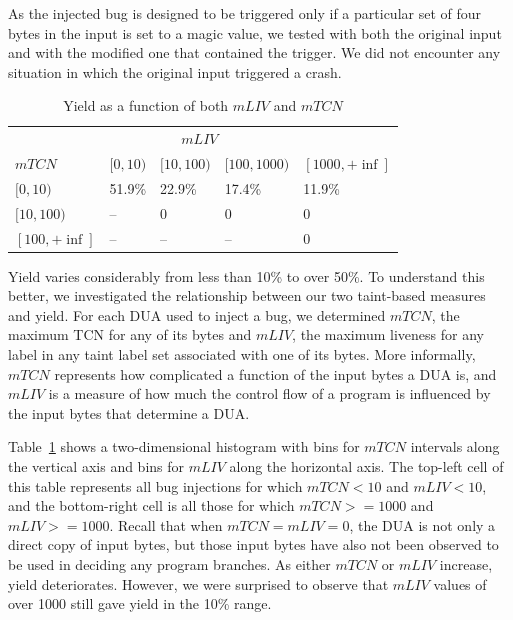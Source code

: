 As the injected bug is designed to be triggered only if a particular set of four bytes in the input is set to a magic value, we tested with both the original input and with the modified one that contained the trigger. 
We did not encounter any situation in which the original input triggered a crash.

\begin{table}[b]
\caption{Yield as a function of both $mLIV$ and $mTCN$}
\centering\footnotesize
\begin{tabular}{l|l|l|l|l} 
       & \multicolumn{3}{c}{$mLIV$} &  \\  
$mTCN$ &         $[0,10)$ & $[10,100)$ & $[100,1000)$ & $[1000,+\inf]$ \\  \hline 
$[0,10)$ &       51.9\%   & 22.9\%     & 17.4\%       & 11.9\%          \\
$[10,100)$ &     --       & 0          & 0            & 0     \\
$[100,+\inf]$ &  --       & --         & --           & 0     \\ 
\end{tabular}
\label{table:yield-breakdown}
\end{table}

Yield varies considerably from less than 10\% to over 50\%.
To understand this better, we investigated the relationship between our two taint-based measures and yield.
For each DUA used to inject a bug, we determined $mTCN$, the maximum TCN for any of its bytes and $mLIV$, the maximum liveness for any label in any taint label set associated with one of its bytes.  
More informally, $mTCN$ represents how complicated a function of the input bytes a DUA is, and $mLIV$ is a measure of how much the control flow of a program is influenced by the input bytes that determine a DUA.

Table~\ref{table:yield-breakdown} shows a two-dimensional histogram with bins for $mTCN$ intervals along the vertical axis and bins for $mLIV$ along the horizontal axis.
The top-left cell of this table represents all bug injections for which $mTCN<10$ and $mLIV<10$, and the bottom-right cell is all those for which $mTCN>=1000$ and $mLIV>=1000$.
Recall that when  $mTCN=mLIV=0$, the DUA is not only a direct copy of input bytes, but those input bytes have also not been observed to be used in deciding any program branches. 
As either $mTCN$ or $mLIV$ increase, yield deteriorates.  
However, we were surprised to observe that $mLIV$ values of over 1000 still gave yield in the 10\% range.

